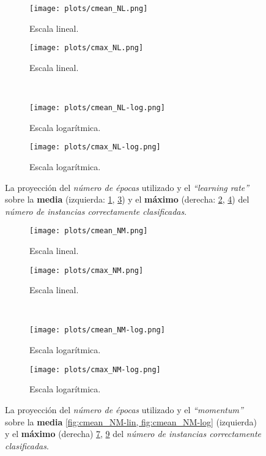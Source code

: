 
\begin{figure}[h]
	\centering
	\begin{subfigure}[b]{0.49\textwidth}
        \texttt{[image: plots/cmean\_NL.png]}
        \caption{Escala lineal.}
        \label{fig:cmean_NL-lin}
    \end{subfigure}
	\begin{subfigure}[b]{0.49\textwidth}
        \texttt{[image: plots/cmax\_NL.png]}
        \caption{Escala lineal.}
        \label{fig:cmax_NL-lin}
    \end{subfigure}
    \\
	\begin{subfigure}[b]{0.49\textwidth}
        \texttt{[image: plots/cmean\_NL-log.png]}
        \caption{Escala logarítmica.}
        \label{fig:cmean_NL-log}
    \end{subfigure}
	\begin{subfigure}[b]{0.49\textwidth}
        \texttt{[image: plots/cmax\_NL-log.png]}
        \caption{Escala logarítmica.}
        \label{fig:cmax_NL-log}
    \end{subfigure}    
	
	\caption{La proyección del \emph{número de épocas} utilizado y el \emph{``learning rate''} 
			 sobre la \textbf{media} (izquierda: \ref{fig:cmean_NL-lin}, \ref{fig:cmean_NL-log})
			 y el \textbf{máximo} (derecha: \ref{fig:cmax_NL-lin}, \ref{fig:cmax_NL-log})
			 del \emph{número de instancias correctamente clasificadas}. 
			}
	\label{fig:NL}
\end{figure}


\begin{figure}[h]
	\centering
	\begin{subfigure}[b]{0.49\textwidth}
        \texttt{[image: plots/cmean\_NM.png]}
        \caption{Escala lineal.}
        \label{fig:cmean_NM-lin}
    \end{subfigure}
	\begin{subfigure}[b]{0.49\textwidth}
        \texttt{[image: plots/cmax\_NM.png]}
        \caption{Escala lineal.}
        \label{fig:cmax_NM-lin}
    \end{subfigure}
    \\
	\begin{subfigure}[b]{0.49\textwidth}
        \texttt{[image: plots/cmean\_NM-log.png]}
        \caption{Escala logarítmica.}
        \label{fig:cmean_NM-log}
    \end{subfigure}
	\begin{subfigure}[b]{0.49\textwidth}
        \texttt{[image: plots/cmax\_NM-log.png]}
        \caption{Escala logarítmica.}
        \label{fig:cmax_NM-log}
    \end{subfigure}    
	
	\caption{La proyección del \emph{número de épocas} utilizado y el \emph{``momentum''} 
			 sobre la \textbf{media} \ref{fig:cmean_NM-lin, fig:cmean_NM-log} (izquierda) 
			 y el \textbf{máximo} (derecha) \ref{fig:cmax_NM-lin}, \ref{fig:cmax_NM-log}
			 del \emph{número de instancias correctamente clasificadas}. }
	\label{fig:NM}
\end{figure}

